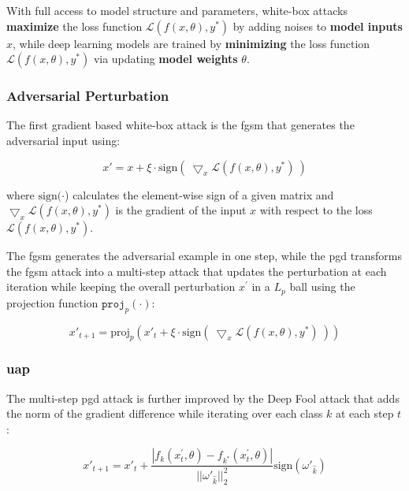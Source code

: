 With full access to model structure and parameters, white-box attacks \textbf{maximize} the loss function  $\mathcal{L}(f(x, \theta), y^*)$ by adding noises to \textbf{ model inputs} $x$, while deep learning models are trained by \textbf{minimizing} the loss function  $\mathcal{L}(f(x, \theta), y^*)$ via updating \textbf{model weights} $\theta$.

\subsubsection{Adversarial Perturbation}

The first gradient based white-box attack is the \acrfull{fgsm} \citep{goodfellow2015explaining} that generates the adversarial input using:

\begin{equation}
x' = x + \xi \cdot \text{sign}(\ \bigtriangledown_x \mathcal{L}(f(x, \theta), y^*)\ )    
\end{equation} 

where $\text{sign}(\cdot$) calculates the element-wise sign of a given matrix and $\bigtriangledown_x \mathcal{L}(f(x, \theta), y^*)$ is the gradient of the input $x$ with respect to the loss $\mathcal{L}(f(x, \theta), y^*)$.

The \acrshort{fgsm} generates the adversarial example in one step, while the \acrfull{pgd} \citep{madry2017towards} transforms the \acrshort{fgsm} attack into a multi-step attack that updates the perturbation at each iteration while keeping the overall perturbation $x^{'}$ in a $L_p$ ball using the projection function $\texttt{proj}_{p}(\cdot)$:

\begin{equation}
x'_{t+1} = \text{proj}_{p}(x'_t + \xi \cdot \text{sign}(\ \bigtriangledown_x \mathcal{L}(f(x, \theta), y^*)\ ))
\end{equation}


\subsubsection{\acrfull{uap}}

The multi-step \acrshort{pgd} attack is further improved by the Deep Fool attack \citep{moosavidezfooli2016deepfool} that adds the norm of the gradient difference while iterating over each class $k$ at each step $t$:

\begin{equation}
x'_{t+1} = x'_t + \frac{|f_k(x^{'}_{t}, \theta) - f_{k^{*}}(x^{'}_{t}, \theta)|}{||\omega'_{\hat{k}}||^2_2} \text{sign}(\omega'_{\hat{k}})
\end{equation}

